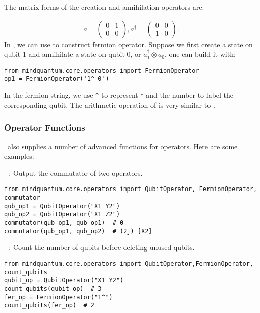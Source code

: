 The matrix forms of the creation and annihilation operators are:

\begin{align*}
    a=\begin{pmatrix}
        0 & 1 \\
        0 & 0
    \end{pmatrix},
    a^\dagger=\begin{pmatrix}
        0 & 0 \\
        1 & 0
    \end{pmatrix}.
\end{align*}
In \MindQuantum, we can use \FermionOperator to construct fermion operator. Suppose we first create a state on qubit 1 and annihilate a state on qubit 0, or $a_1^\dagger\otimes a_0$, one can build it with:
\begin{lstlisting}
from mindquantum.core.operators import FermionOperator
op1 = FermionOperator('1^ 0')
\end{lstlisting}
In the fermion string, we use \verb|^| to represent $\dagger$ and the number to label the corresponding qubit. The arithmetic operation of \FermionOperator is very similar to \QubitOperator.


\subsubsection{Operator Functions}

\MindQuantum\ also supplies a number of advanced functions for operators. Here are some examples:

-  : Output the commutator of two operators.

\begin{lstlisting}
from mindquantum.core.operators import QubitOperator, FermionOperator, commutator
qub_op1 = QubitOperator("X1 Y2")
qub_op2 = QubitOperator("X1 Z2")
commutator(qub_op1, qub_op1)  # 0
commutator(qub_op1, qub_op2)  # (2j) [X2]
\end{lstlisting}

-  : Count the number of qubits before deleting unused qubits.

\begin{lstlisting}
from mindquantum.core.operators import QubitOperator,FermionOperator, count_qubits
qubit_op = QubitOperator("X1 Y2")
count_qubits(qubit_op)  # 3
fer_op = FermionOperator("1^")
count_qubits(fer_op)  # 2
\end{lstlisting}


